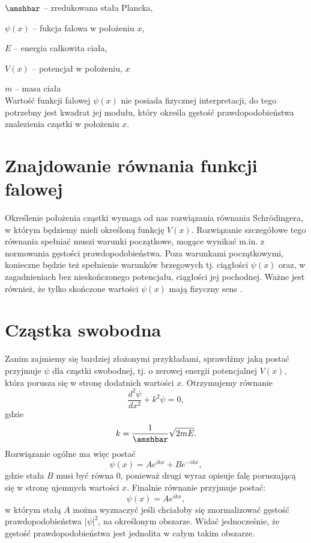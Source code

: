 \documentclass{SGGW-thesis}
\begin{document}
	$\amshbar$ -- zredukowana stała Plancka,
	
	$\psi(x)$ -- fukcja falowa w położeniu $x$,
	
	$E$ -- energia całkowita ciała,
	
	$V(x)$ -- potencjał w położeniu, $x$
	
	$m$ -- masa ciała\\
	
	Wartość funkcji falowej $\psi(x)$ nie posiada fizycznej interpretacji, do tego potrzebny jest kwadrat jej modułu, który określa gęstość prawdopodobieństwa znalezienia cząstki w położeniu $x$. 
	\section{Znajdowanie równania funkcji falowej}
	Określenie położenia cząstki wymaga od nas rozwiązania równania Schrödingera, w którym będziemy mieli określoną funkcję $V(x)$. Rozwiązanie szczegółowe tego równania spełniać muszi warunki początkowe, mogące wynikać m.in. z normowania gęstości prawdopodobieństwa. Poza warunkami początkowymi, konieczne będzie też spełnienie warunków brzegowych tj. ciągłości $\psi(x)$ oraz, w zagadnieniach bez nieskończonego potencjału, ciągłości jej pochodnej. Ważne jest również, że tylko skończone wartości $\psi(x)$ mają fizyczny sens \cite{fiz atom}.
	
	\section{Cząstka swobodna}
	Zanim zajmiemy się bardziej złożonymi przykładami, sprawdźmy jaką postać przyjmuje $\psi$ dla cząstki swobodnej, tj. o zerowej energii potencjalnej $V(x)$, która porusza się w stronę dodatnich wartości $x$. Otrzymujemy równanie 
	\begin{equation}\label{eqn:free-particle-schrodigner}
	\frac{d^2\psi}{dx^2}+k^2\psi=0,
	\end{equation}
gdzie
	\begin{equation}
	k=\frac{1}{\amshbar}\sqrt{2mE}.
	\end{equation}
Rozwiązanie ogólne ma więc postać
	\begin{equation}\label{eqn:free-particle-gen-solution}
	\psi(x)=Ae^{ikx} + Be^{-ikx},
	\end{equation}
gdzie stała $B$ musi być równa 0, ponieważ drugi wyraz opisuje falę poruszającą się w stronę ujemnych wartości $x$. Finalnie równanie przyjmuje postać:
	\begin{equation}\label{eqn:free-particle-solution}
	\psi(x) = Ae^{ikx},
	\end{equation}
w którym stałą $A$ można wyznaczyć jeśli chciałoby się znormalizować gęstość prawdopodobieństwa $|\psi|^2$, na określonym obszarze. Widać jednocześnie, że gęstość prawdopodobieństwa jest jednolita w całym takim obszarze.
	
\end{document}
